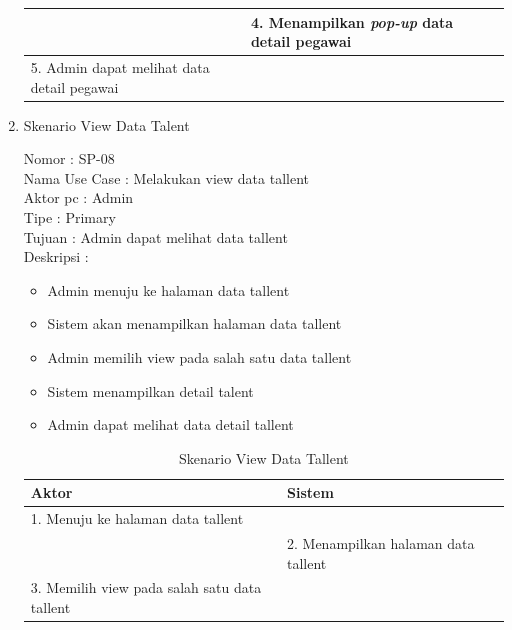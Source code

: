 \begin{enumerate}
\begin{table}
\begin{tabular}{ | l | p{55mm} |}
		\hline
		
		& 4.	Menampilkan \textit{pop-up} data detail pegawai \\
		
		\hline
		
		5.	Admin dapat melihat data detail pegawai  & \\
		\hline
		
		
	\end{tabular}
\end{table}

\item Skenario View Data Talent

Nomor \kern 3.6pc : SP-08 \\
Nama Use Case : Melakukan view data tallent \\
Aktor  pc : Admin \\
Tipe \kern 4.6pc : Primary \\
Tujuan \kern 3.6pc : Admin dapat melihat data tallent \\
Deskripsi \kern 2.5pc : 

\begin{itemize}
	\item Admin menuju ke halaman data tallent
	\item Sistem akan menampilkan halaman data tallent
	\item Admin memilih view pada salah satu data tallent
	\item Sistem menampilkan detail talent
	\item Admin dapat melihat data detail tallent
	
\end{itemize}

\begin{table}
	\caption{Skenario View Data Tallent}
	\centering
	\begin{tabular}{ |  p{50mm} | p{70mm} |}
		\hline 
		\textbf{Aktor} & \textbf{Sistem} \\
		\hline
		
		1.	Menuju ke halaman data tallent &  \\
		
		\hline
		
		&  2.	Menampilkan halaman data tallent \\
		
		\hline
		
		3. Memilih view pada salah satu data tallent & \\
		
		\hline
		

\end{tabular}
\end{table}
\end{enumerate}
